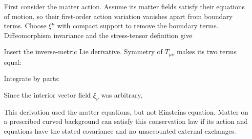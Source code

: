 \documentclass[
  11pt,
  letterpaper,
  oneside,
  openany]{scrbook}
\begin{document}
First consider the matter action. Assume its matter fields satisfy their
equations of motion, so their first-order action variation vanishes
apart from boundary terms. Choose \(\xi^\mu\) with compact support to
remove the boundary terms. Diffeomorphism invariance and the
stress-tensor definition give

\begin{center}
\begingroup
{}
\ifdim\wd\grmathbox>\linewidth
\resizebox{\linewidth}{!}{\usebox{\grmathbox}}
\else\usebox{\grmathbox}\fi
\endgroup
\end{center}

Insert the inverse-metric Lie derivative. Symmetry of \(T_{\mu\nu}\)
makes its two terms equal:

\begin{center}
\begingroup
{}
\ifdim\wd\grmathbox>\linewidth
\resizebox{\linewidth}{!}{\usebox{\grmathbox}}
\else\usebox{\grmathbox}\fi
\endgroup
\end{center}

Integrate by parts:

\begin{center}
\begingroup
{}
\ifdim\wd\grmathbox>\linewidth
\resizebox{\linewidth}{!}{\usebox{\grmathbox}}
\else\usebox{\grmathbox}\fi
\endgroup
\end{center}

Since the interior vector field \(\xi_\nu\) was arbitrary,

\begin{center}
\begingroup
{}
\ifdim\wd\grmathbox>\linewidth
\resizebox{\linewidth}{!}{\usebox{\grmathbox}}
\else\usebox{\grmathbox}\fi
\endgroup
\end{center}

This derivation used the matter equations, but not
Einstein\textquotesingle s equation. Matter on a prescribed curved
background can satisfy this conservation law if its action and equations
have the stated covariance and no unaccounted external exchanges.
\end{document}
